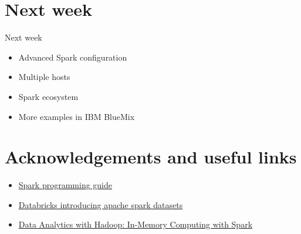 \documentclass{beamer}
\begin{document}
\section*{Next week}

\begin{frame}{Next week}
  \begin{itemize}
  \item Advanced Spark configuration
  \item Multiple hosts
  \item Spark ecosystem
  \item More examples in IBM BlueMix
  \end{itemize}
\end{frame}

\section{Acknowledgements and useful links}

\begin{frame}
  \begin{itemize}
\item \href{http://spark.apache.org/docs/latest/programming-guide.html}{Spark programming guide}
\item \href{https://databricks.com/blog/2016/01/04/introducing-apache-spark-datasets.html}{Databricks introducing apache spark datasets}
\item \href{https://www.safaribooksonline.com/library/view/data-analytics-with/9781491913734/ch04.html}{Data Analytics with Hadoop: In-Memory Computing with Spark}
  \end{itemize}
\end{frame}
\end{document}

